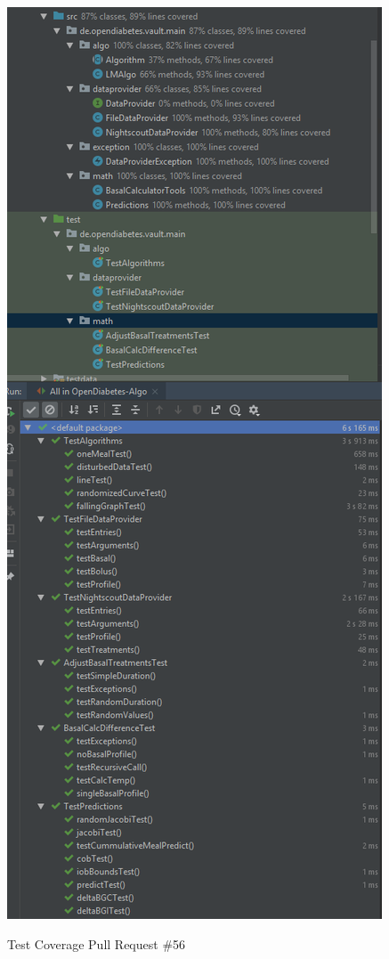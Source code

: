 \documentclass[accentcolor=tud0b,12pt,paper=a4]{tudreport}
\begin{document}
\begin{figure}[h]
\centering
\caption{Test Coverage Pull Request \#56}
\includegraphics[width=\textwidth,height=\textheight,keepaspectratio]{pr-cov-56}
\label{pr-cov:56}
\end{figure}
\end{document}
